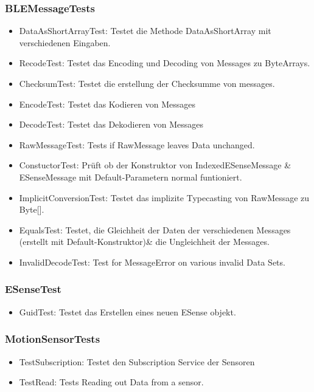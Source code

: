 \documentclass[../validierung.tex]{subfiles}
\begin{document}
			\subsubsection{BLEMessageTests}
				\begin{itemize}
					\item DataAsShortArrayTest: Testet die Methode DataAsShortArray mit verschiedenen Eingaben.
					\item RecodeTest: Testet das Encoding und Decoding von Messages zu ByteArrays.
					\item ChecksumTest: Testet die erstellung der Checksumme von messages.
					\item EncodeTest: Testet das Kodieren von Messages
					\item DecodeTest: Testet das Dekodieren von Messages
					\item RawMessageTest: Tests if RawMessage leaves Data unchanged.
					\item ConstuctorTest: Prüft ob der Konstruktor von IndexedESenseMessage \& ESenseMessage mit Default-Parametern normal funtioniert.
					\item ImplicitConversionTest: Testet das implizite Typecasting von RawMessage zu Byte[].
					\item EqualsTest: Testet, die Gleichheit der Daten der verschiedenen Messages (erstellt mit Default-Konstruktor)\& die Ungleichheit 
					der Messages.
					\item InvalidDecodeTest: Test for MessageError on various invalid Data Sets.
				\end{itemize}
			\subsubsection{ESenseTest}
				\begin{itemize}
					\item GuidTest: Testet das Erstellen eines neuen ESense objekt.
				\end{itemize}
			\subsubsection{MotionSensorTests}
				\begin{itemize}
					\item TestSubscription: Testet den Subscription Service der Sensoren
					\item TestRead: Tests Reading out Data from a sensor.
				\end{itemize}
\end{document}
